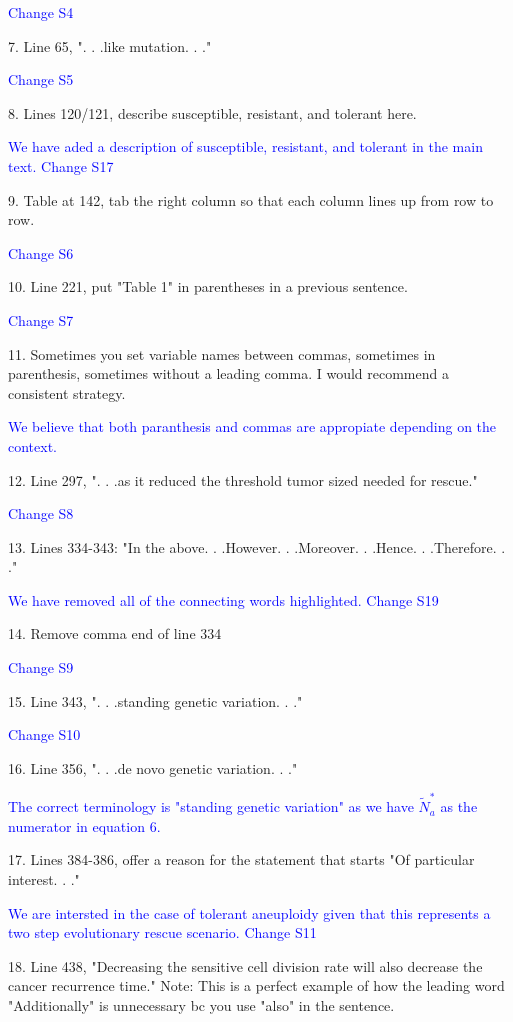 \documentclass[12pt]{extarticle}
\begin{document}
\textcolor{blue}{Change S4}

7. Line 65, ". . .like mutation. . ."

\textcolor{blue}{Change S5}

8. Lines 120/121, describe susceptible, resistant, and tolerant here.

\textcolor{blue}{We have aded a description of susceptible, resistant, and tolerant in the main text. Change S17}

9. Table at 142, tab the right column so that each column lines up from row to row.

\textcolor{blue}{Change S6}

10. Line 221, put "Table 1" in parentheses in a previous sentence.

\textcolor{blue}{Change S7}

11. Sometimes you set variable names between commas, sometimes in parenthesis, sometimes without a leading comma. I would recommend a consistent strategy.

\textcolor{blue}{We believe that both paranthesis and commas are appropiate depending on the context.}

12. Line 297, ". . .as it reduced the threshold tumor sized needed for rescue."

\textcolor{blue}{Change S8}

13. Lines 334-343: "In the above. . .However. . .Moreover. . .Hence. . .Therefore. . ."

\textcolor{blue}{We have removed all of the connecting words highlighted. Change S19}

14. Remove comma end of line 334

\textcolor{blue}{Change S9}

15. Line 343, ". . .standing genetic variation. . ."

\textcolor{blue}{Change S10}

16. Line 356, ". . .de novo genetic variation. . ."

\textcolor{blue}{The correct terminology is "standing genetic variation" as we have $\tilde{N}_a^*$ as the numerator in equation 6.}

17. Lines 384-386, offer a reason for the statement that starts "Of particular interest. . ."

\textcolor{blue}{We are intersted in the case of tolerant aneuploidy given that this represents a two step evolutionary rescue scenario. Change S11}

18. Line 438, "Decreasing the sensitive cell division rate will also decrease the cancer recurrence time." Note: This is a perfect example of how the leading word "Additionally" is unnecessary bc you use "also" in the sentence.
\end{document}
